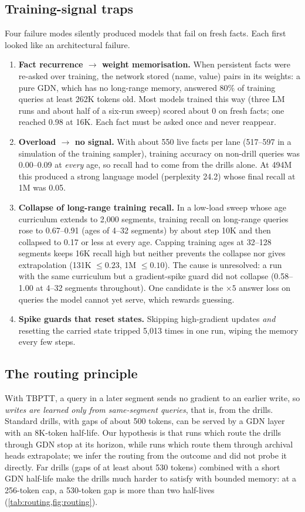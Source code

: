 \documentclass[11pt]{article}
\begin{document}
\subsection{Training-signal traps}
\label{sec:traps}
Four failure modes silently produced models that fail on fresh facts. Each first looked like an architectural failure.
\begin{enumerate}
\item \textbf{Fact recurrence $\to$ weight memorisation.} When persistent facts were re-asked over training, the network stored (name, value) pairs in its weights: a pure GDN, which has no long-range memory, answered 80\% of training queries at least 262K tokens old. Most models trained this way (three LM runs and about half of a six-run sweep) scored about 0 on fresh facts; one reached 0.98 at 16K. Each fact must be asked once and never reappear.
\item \textbf{Overload $\to$ no signal.} With about 550 live facts per lane (517--597 in a simulation of the training sampler), training accuracy on non-drill queries was 0.00--0.09 at \emph{every} age, so recall had to come from the drills alone. At 494M this produced a strong language model (perplexity 24.2) whose final recall at 1M was 0.05.
\item \textbf{Collapse of long-range training recall.} In a low-load sweep whose age curriculum extends to 2{,}000 segments, training recall on long-range queries rose to 0.67--0.91 (ages of 4--32 segments) by about step 10K and then collapsed to 0.17 or less at every age. Capping training ages at 32--128 segments keeps 16K recall high but neither prevents the collapse nor gives extrapolation (131K $\le 0.23$, 1M $\le 0.10$). The cause is unresolved: a run with the same curriculum but a gradient-spike guard did not collapse (0.58--1.00 at 4--32 segments throughout). One candidate is the $\times 5$ answer loss on queries the model cannot yet serve, which rewards guessing.
\item \textbf{Spike guards that reset states.} Skipping high-gradient updates \emph{and} resetting the carried state tripped 5{,}013 times in one run, wiping the memory every few steps.
\end{enumerate}

\subsection{The routing principle}
\label{sec:routing}
With TBPTT, a query in a later segment sends no gradient to an earlier write, so \emph{writes are learned only from same-segment queries}, that is, from the drills. Standard drills, with gaps of about 500 tokens, can be served by a GDN layer with an 8K-token half-life. Our hypothesis is that runs which route the drills through GDN stop at its horizon, while runs which route them through archival heads extrapolate; we infer the routing from the outcome and did not probe it directly. Far drills (gaps of at least about 530 tokens) combined with a short GDN half-life make the drills much harder to satisfy with bounded memory: at a 256-token cap, a 530-token gap is more than two half-lives (\cref{tab:routing,fig:routing}).
\end{document}
